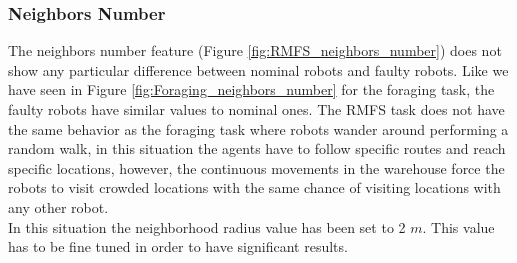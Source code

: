 \documentclass[../../Thesis.tex]{subfiles}
\begin{document}
			\subsubsection{Neighbors Number}
				The neighbors number feature (Figure \ref{fig:RMFS_neighbors_number}) does not show any particular difference between nominal robots and faulty robots. Like we have seen in Figure \ref{fig:Foraging_neighbors_number} for the foraging task, the faulty robots have similar values to nominal ones.  The RMFS task does not have the same behavior as the foraging task where robots wander around performing a random walk, in this situation the agents have to follow specific routes and reach specific locations, however, the continuous movements in the warehouse force the robots to visit crowded locations with the same chance of visiting locations with any other robot.\\
				In this situation the neighborhood radius value has been set to 2 $m$. This value has to be fine tuned in order to have significant results.
\end{document}
